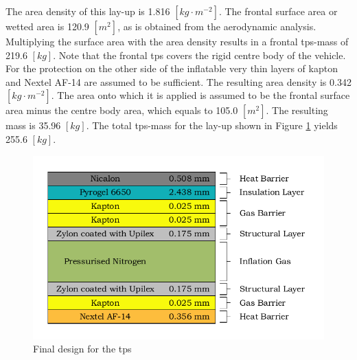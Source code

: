 The area density of this lay-up is 1.816 $\left[kg\cdot m^{-2}\right]$. The frontal surface area or wetted area is 120.9 $\left[m^2\right]$, as is obtained from the aerodynamic analysis. Multiplying the surface area with the area density results in a frontal \gls{tps}-mass of 219.6 $\left[kg\right]$. Note that the frontal \gls{tps} covers the rigid centre body of the vehicle. For the protection on the other side of the inflatable very thin layers of kapton and Nextel AF-14 are assumed to be sufficient. The resulting area density is 0.342 $\left[kg\cdot m^{-2}\right]$. The area onto which it is applied is assumed to be the frontal surface area minus the centre body area, which equals to 105.0 $\left[m^2\right]$. The resulting mass is 35.96 $\left[kg\right]$. The total \gls{tps}-mass for the lay-up shown in Figure \ref{fig:finallayup} yields 255.6 $\left[kg\right]$. 

\begin{figure}[H]
	\centering
	\includegraphics{./Figure/Thermal/finallayup.pdf}
	\caption{Final design for the \acrlong{tps}}
	\label{fig:finallayup}
\end{figure}
